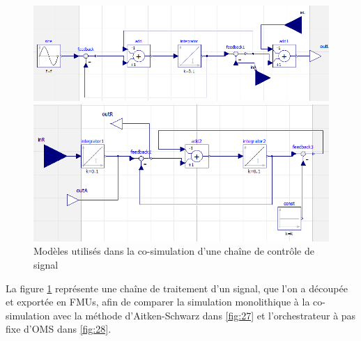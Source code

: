 \begin{figure}[hbt!]
    \centering
    \begin{minipage}[b]{0.4\textwidth}
        \includegraphics[width=\textwidth]{chainevolL.png}
    \end{minipage}
    \begin{minipage}[b]{0.4\textwidth}
      \includegraphics[width=\textwidth]{chainevolR.png}
  \end{minipage}
  \caption{Modèles utilisés dans la co-simulation d'une chaîne de contrôle de signal}
  \label{fig:29}
  \end{figure}
\newpage

La figure \ref{fig:29} représente une chaîne de traitement d'un signal, que l'on a découpée et exportée en FMUs, afin de comparer la simulation monolithique à la co-simulation avec la méthode d'Aitken-Schwarz dans \ref{fig:27} et l'orchestrateur à pas fixe d'OMS dans \ref{fig:28}.

